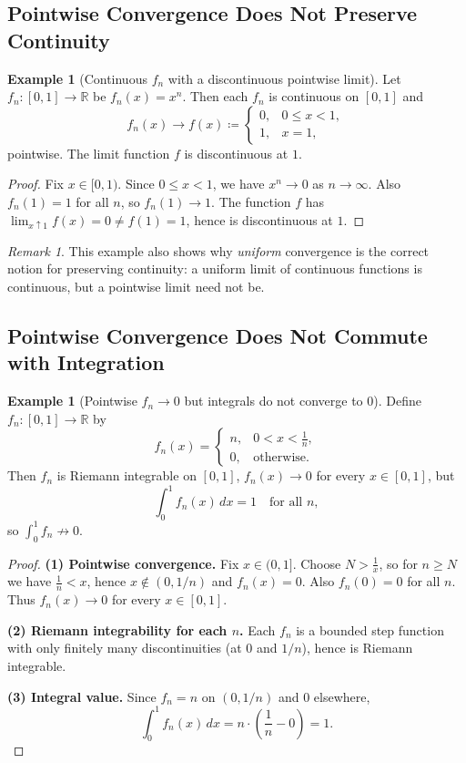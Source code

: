 \documentclass[12pt]{article}
\numberwithin{equation}{section}
\def\diff{d}
\newcommand{\RR}{\mathbb{R}}
\newcommand{\diff}{\mathop{}\!\mathrm{d}}    %
\newcommand{\casesm}[1]{\begin{cases}#1\end{cases}}
\theoremstyle{plain}
\theoremstyle{definition}
\newtheorem{example}[theorem]{Example}
\theoremstyle{remark}
\newtheorem{remark}[theorem]{Remark}
\begin{document}
\subsection{Pointwise Convergence Does Not Preserve Continuity}

\begin{example}[Continuous $f_n$ with a discontinuous pointwise limit]\label{ex:app_xn}
Let $f_n:[0,1]\to\RR$ be $f_n(x)=x^n$. Then each $f_n$ is continuous on $[0,1]$ and
\[
f_n(x)\to f(x)\coloneqq
\casesm{
0, & 0\le x<1,\\
1, & x=1,
}
\]
pointwise. The limit function $f$ is discontinuous at $1$.
\end{example}

\begin{proof}
Fix $x\in[0,1)$. Since $0\le x<1$, we have $x^n\to 0$ as $n\to\infty$.
Also $f_n(1)=1$ for all $n$, so $f_n(1)\to 1$.
The function $f$ has $\lim_{x\uparrow 1} f(x)=0\neq f(1)=1$, hence is discontinuous at $1$.
\end{proof}

\begin{remark}
This example also shows why \emph{uniform} convergence is the correct notion for preserving continuity:
a uniform limit of continuous functions is continuous, but a pointwise limit need not be.
\end{remark}

\subsection{Pointwise Convergence Does Not Commute with Integration}

\begin{example}[Pointwise $f_n\to 0$ but integrals do not converge to $0$]\label{ex:app_spike}
Define $f_n:[0,1]\to\RR$ by
\[
f_n(x)=
\casesm{
n, & 0<x<\frac{1}{n},\\
0, & \text{otherwise}.
}
\]
Then $f_n$ is Riemann integrable on $[0,1]$, $f_n(x)\to 0$ for every $x\in[0,1]$,
but
\[
\int_0^1 f_n(x)\,\diff x = 1 \quad \text{for all } n,
\]
so $\int_0^1 f_n \not\to 0$.
\end{example}

\begin{proof}
\textbf{(1) Pointwise convergence.}
Fix $x\in(0,1]$. Choose $N>\frac{1}{x}$, so for $n\ge N$ we have $\frac{1}{n}<x$, hence $x\notin(0,1/n)$ and $f_n(x)=0$.
Also $f_n(0)=0$ for all $n$. Thus $f_n(x)\to 0$ for every $x\in[0,1]$.

\textbf{(2) Riemann integrability for each $n$.}
Each $f_n$ is a bounded step function with only finitely many discontinuities (at $0$ and $1/n$), hence is Riemann integrable.

\textbf{(3) Integral value.}
Since $f_n=n$ on $(0,1/n)$ and $0$ elsewhere,
\[
\int_0^1 f_n(x)\,\diff x
= n\cdot \left(\frac{1}{n}-0\right)=1.
\]
\end{proof}
\end{document}
